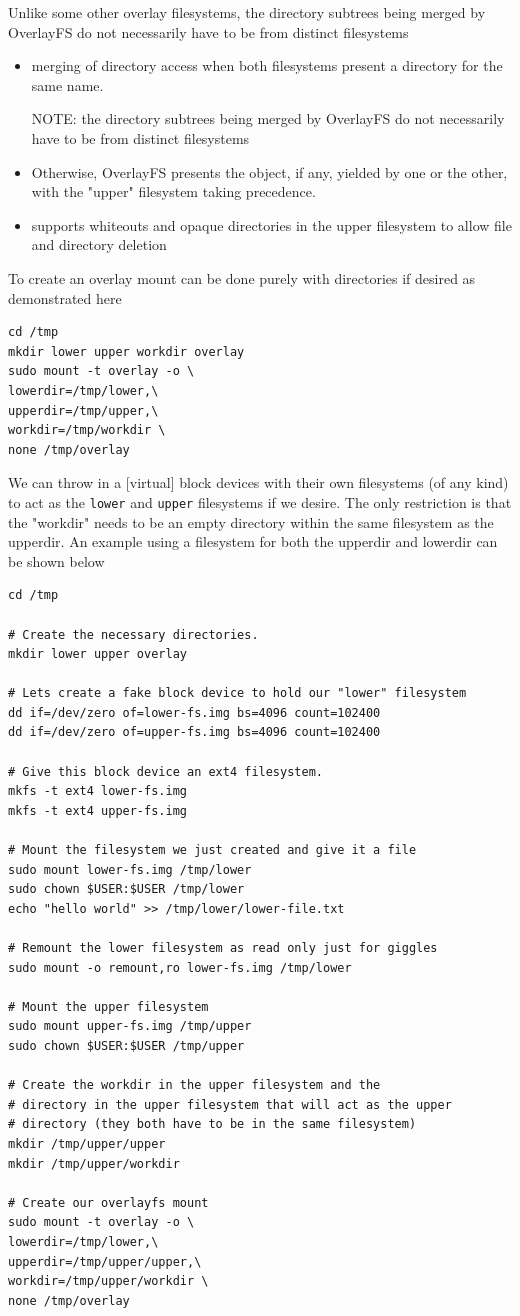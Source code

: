 Unlike some other overlay filesystems, the directory subtrees being merged by
OverlayFS do not necessarily have to be from distinct filesystems
\begin{itemize}
  \item   merging of directory access when both filesystems present a directory
  for the same name. 
  
NOTE: the directory subtrees being merged by OverlayFS do not necessarily have
to be from distinct filesystems
  
  \item Otherwise, OverlayFS presents the object, if any, yielded by one or the
  other, with the "upper" filesystem taking precedence.
  
  \item supports whiteouts and opaque directories in the upper filesystem to
  allow file and directory deletion
\end{itemize}

To create an overlay mount can be done purely with directories if desired as
demonstrated here

\begin{verbatim}
cd /tmp
mkdir lower upper workdir overlay
sudo mount -t overlay -o \
lowerdir=/tmp/lower,\
upperdir=/tmp/upper,\
workdir=/tmp/workdir \
none /tmp/overlay
\end{verbatim}
We can throw in a [virtual] block devices with their own filesystems (of any
kind) to act as the \verb!lower! and \verb!upper! filesystems if we desire. 
The only restriction is that the "workdir" needs to be an empty directory within
the same filesystem as the upperdir. An example using a filesystem for both the
upperdir and lowerdir can be shown below

{\tiny
\begin{verbatim}
cd /tmp

# Create the necessary directories.
mkdir lower upper overlay

# Lets create a fake block device to hold our "lower" filesystem
dd if=/dev/zero of=lower-fs.img bs=4096 count=102400
dd if=/dev/zero of=upper-fs.img bs=4096 count=102400

# Give this block device an ext4 filesystem.
mkfs -t ext4 lower-fs.img
mkfs -t ext4 upper-fs.img

# Mount the filesystem we just created and give it a file
sudo mount lower-fs.img /tmp/lower
sudo chown $USER:$USER /tmp/lower
echo "hello world" >> /tmp/lower/lower-file.txt

# Remount the lower filesystem as read only just for giggles
sudo mount -o remount,ro lower-fs.img /tmp/lower

# Mount the upper filesystem
sudo mount upper-fs.img /tmp/upper
sudo chown $USER:$USER /tmp/upper

# Create the workdir in the upper filesystem and the 
# directory in the upper filesystem that will act as the upper
# directory (they both have to be in the same filesystem)
mkdir /tmp/upper/upper
mkdir /tmp/upper/workdir

# Create our overlayfs mount
sudo mount -t overlay -o \
lowerdir=/tmp/lower,\
upperdir=/tmp/upper/upper,\
workdir=/tmp/upper/workdir \
none /tmp/overlay
\end{verbatim}
}

